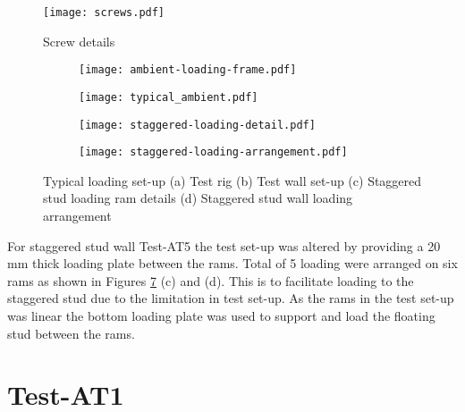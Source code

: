 \begin{figure}[htbp]
	\centering
			\texttt{[image: screws.pdf]}
		\caption{Screw details}
		\label{fig:screw-details}
\end{figure}
\begin{figure}
	\centering
	\begin{subfigure}[b]{0.75\textwidth}
		\centering
		\texttt{[image: ambient-loading-frame.pdf]}
		\caption{}
		\label{subfig:ambient-loading-frame}
	\end{subfigure}
	\begin{subfigure}[b]{0.5\textwidth}
		\centering
		\texttt{[image: typical\_ambient.pdf]}
		\caption{}
		\label{subfig:typical_ambient}
	\end{subfigure}
	   \label{fig:typical-loading-a}
\end{figure}
\begin{figure}
	\ContinuedFloat
	\centering
	\begin{subfigure}[b]{0.5\textwidth}
		\centering
		\texttt{[image: staggered-loading-detail.pdf]}
		\caption{}
		\label{subfig:staggered-loading-detail}
	\end{subfigure}
	\begin{subfigure}[b]{0.75\textwidth}
		\centering
		\texttt{[image: staggered-loading-arrangement.pdf]}
		\caption{}
		\label{subfig:staggered-loading-arrangement}
	\end{subfigure}
	   \caption{Typical loading set-up (a) Test rig (b) Test wall set-up (c) Staggered stud loading ram details (d) Staggered stud wall loading arrangement}
	   \label{fig:typical-loading}
\end{figure}

For staggered stud wall Test-AT5 the test set-up was altered by providing a 20 mm thick loading plate between the rams. Total of 5 loading were arranged on six rams as shown in Figures \ref{fig:typical-loading} (c) and (d). This is to facilitate loading to the staggered stud due to the limitation in test set-up. As the rams in the test set-up was linear the bottom loading plate was used to support and load the floating stud between the rams.  

\section{Test-AT1}\label{sec:Test-AT1}

